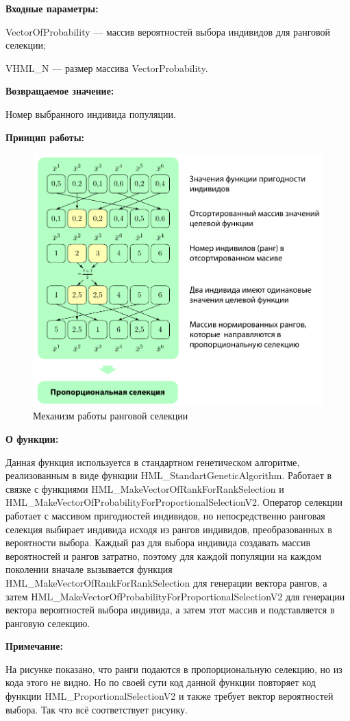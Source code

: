 \textbf{Входные параметры:}
 
 VectorOfProbability --- массив вероятностей выбора индивидов для ранговой селекции;
 
 VHML\_N --- размер массива VectorProbability.

\textbf{Возвращаемое значение:} 

 Номер выбранного индивида популяции.

 \textbf{Принцип работы:}

\begin{figure} [h]
  \center
  \includegraphics [scale=0.8] {HML_RankSelection_Sheme}
  \caption{Механизм работы ранговой селекции} 
  \label{img:HML_RankSelection_Sheme}  
\end{figure}

\textbf{О функции:}

Данная функция используется в стандартном генетическом алгоритме, реализованным в виде функции HML\_StandartGeneticAlgorithm. Работает в связке с функциями HML\_MakeVectorOfRankForRankSelection и HML\_MakeVectorOfProbabilityForProportionalSelectionV2. Оператор селекции работает с массивом пригодностей индивидов, но непосредственно ранговая селекция выбирает индивида исходя из рангов индивидов, преобразованных в вероятности выбора. Каждый раз для выбора индивида создавать массив вероятностей и рангов затратно, поэтому для каждой популяции на каждом поколении вначале вызывается функция HML\_MakeVectorOfRankForRankSelection для генерации вектора рангов, а затем HML\_MakeVectorOfProbabilityForProportionalSelectionV2 для генерации вектора вероятностей выбора индивида, а затем этот массив и подставляется в ранговую селекцию.
  
\textbf{Примечание:}

На рисунке показано, что ранги подаются в пропорциональную селекцию, но из кода этого не видно. Но по своей сути код данной функции повторяет код функции HML\_ProportionalSelectionV2 и также требует вектор вероятностей выбора. Так что всё соответствует рисунку.

